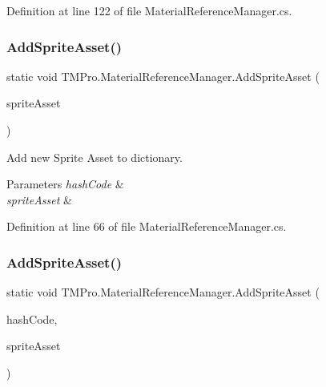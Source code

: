 Definition at line 122 of file Material\+Reference\+Manager.\+cs.

\mbox{\label{class_t_m_pro_1_1_material_reference_manager_a3810186f9c82e44d3ca54ed456f6d8bd}} 
\subsubsection{\texorpdfstring{AddSpriteAsset()}{AddSpriteAsset()}\hspace{0.1cm}{\footnotesize\ttfamily [1/2]}}
{\footnotesize\ttfamily static void T\+M\+Pro.\+Material\+Reference\+Manager.\+Add\+Sprite\+Asset (\begin{DoxyParamCaption}\item[{\mbox{\hyperlink{class_t_m_pro_1_1_t_m_p___sprite_asset}{T\+M\+P\+\_\+\+Sprite\+Asset}}}]{sprite\+Asset }\end{DoxyParamCaption})\hspace{0.3cm}{\ttfamily [static]}}



Add new Sprite Asset to dictionary. 


\begin{DoxyParams}{Parameters}
{\em hash\+Code} & \\
\hline
{\em sprite\+Asset} & \\
\hline
\end{DoxyParams}


Definition at line 66 of file Material\+Reference\+Manager.\+cs.

\mbox{\label{class_t_m_pro_1_1_material_reference_manager_a6ec369694dfd5ba0c8dbebcbc7bd1f97}} 
\subsubsection{\texorpdfstring{AddSpriteAsset()}{AddSpriteAsset()}\hspace{0.1cm}{\footnotesize\ttfamily [2/2]}}
{\footnotesize\ttfamily static void T\+M\+Pro.\+Material\+Reference\+Manager.\+Add\+Sprite\+Asset (\begin{DoxyParamCaption}\item[{int}]{hash\+Code,  }\item[{\mbox{\hyperlink{class_t_m_pro_1_1_t_m_p___sprite_asset}{T\+M\+P\+\_\+\+Sprite\+Asset}}}]{sprite\+Asset }\end{DoxyParamCaption})\hspace{0.3cm}{\ttfamily [static]}}



